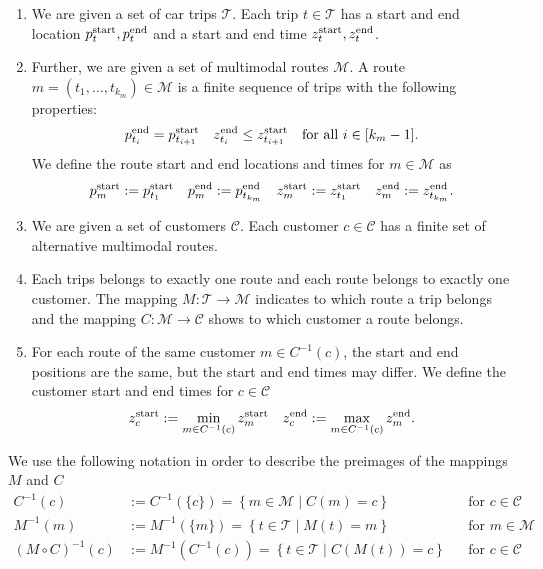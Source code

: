 \begin{definition}

\begin{enumerate}
	\item
We are given a set of car trips $\mathcal{T}$. Each trip $t\in\mathcal{T}$ has a start and end location $p^{\operatorname{start}}_t, p^{\operatorname{end}}_t$ and a start and end time $z^{\operatorname{start}}_t, z^{\operatorname{end}}_t$.

	\item
Further, we are given a set of multimodal routes $\mathcal{M}$. A route ${m=\left(t_1,\dots,t_{k_m}\right)\in\mathcal{M}}$ is a finite sequence of trips with the following properties:
\begin{align*}
	p^{\operatorname{end}}_{t_i} = p^{\operatorname{start}}_{t_{i+1}} && z^{\operatorname{end}}_{t_i} \leq z^{\operatorname{start}}_{t_{i+1}} && \text{for all } i\in[k_m-1].
\end{align*}	
We define the route start and end locations and times for $m\in\mathcal{M}$ as
\begin{align*}
	p^{\operatorname{start}}_m := p^{\operatorname{start}}_{t_1} & &  p^{\operatorname{end}}_m := p^{\operatorname{end}}_{t_{k_m}} & & z^{\operatorname{start}}_m := z^{\operatorname{start}}_{t_1} & & z^{\operatorname{end}}_m := z^{\operatorname{end}}_{t_{k_m}}.
\end{align*}

	\item
We are given a set of customers $\mathcal{C}$. Each customer $c\in\mathcal{C}$ has a finite set of alternative multimodal routes.

	\item
Each trips belongs to exactly one route and each route belongs to exactly one customer. The mapping $M:\mathcal{T}\to\mathcal{M}$ indicates to which route a trip belongs and the mapping $C:\mathcal{M}\to\mathcal{C}$ shows to which customer a route belongs.	

	\item
For each route of the same customer $m\in C^{-1}(c)$, the start and end positions are the same, but the start and end times may differ. We define the customer start and end times for $c\in\mathcal{C}$
\begin{align*}
	z^{\operatorname{start}}_c := \min_{m\in C^{-1}(c)}z^{\operatorname{start}}_m & & z^{\operatorname{end}}_c := \max_{m\in C^{-1}(c)}z^{\operatorname{end}}_m .
\end{align*}
\end{enumerate}

\end{definition}

We use the following notation in order to describe the preimages of the mappings $M$ and $C$
\begin{align*}
	C^{-1}(c) & := C^{-1}\left(\{c\}\right) = \left\{m\in\mathcal{M}\mid C(m)=c\right\} && \text{for } c\in\mathcal{C} \\
	M^{-1}(m) & := M^{-1}\left(\{m\}\right) = \left\{t\in\mathcal{T}\mid M(t)=m\right\} && \text{for } m\in\mathcal{M} \\
	\left(M\circ C\right)^{-1}(c) & := M^{-1}\left(C^{-1}(c)\right) = \left\{t\in\mathcal{T}\mid C\left(M(t)\right)=c\right\} && \text{for } c\in\mathcal{C}
\end{align*}

